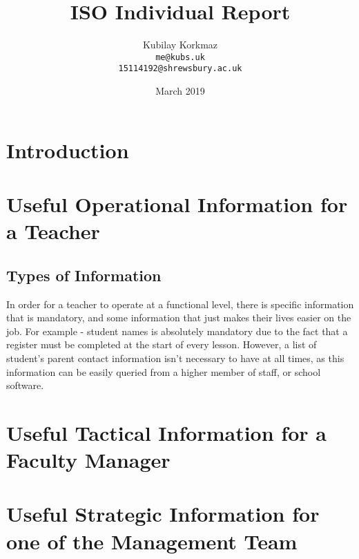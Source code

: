 \documentclass{article}
\title{ISO Individual Report}
\author{
Kubilay Korkmaz\\
\texttt{me@kubs.uk}\\
\texttt{15114192@shrewsbury.ac.uk}
}
\date{March 2019}
\begin{document}
\maketitle

\clearpage

\tableofcontents

\clearpage

\section{Introduction}

\section{Useful Operational Information for a Teacher}
\subsection{Types of Information}In order for a teacher to operate at a functional level, there is specific information that is mandatory, and some information that just makes their lives easier on the job. For example - student names is absolutely mandatory due to the fact that a register must be completed at the start of every lesson. However, a list of student's parent contact information isn't necessary to have at all times, as this information can be easily queried from a higher member of staff, or school software. 

\section{Useful Tactical Information for a Faculty Manager}

\section{Useful Strategic Information for one of the Management Team}

\newpage

\printglossary[type=\acronymtype]
 
\printglossary

\lstlistoflistings
\end{document}
